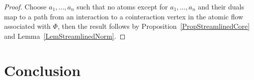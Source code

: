 \documentclass[a4paper]{amsart}
\theoremstyle{definition}
\theoremstyle{remark}
\begin{document}
\begin{proof}
Choose $a_1,\dots,a_n$ such that no atoms except for $a_1,\dots,a_n$ and their duals map to a path from an interaction to a cointeraction vertex in the atomic flow associated with $\Phi$, then the result follows by Proposition~\ref{PropStreamlinedCore} and Lemma~\ref{LemStreamlinedNorm}.
\end{proof}

\section{Conclusion}



\end{document}

